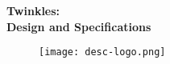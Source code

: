 \documentclass[12pt]{report}
\newcommand{\docheader}{{Twinkles:\\ \medskip Design and Specifications}}
\begin{document}
\pagestyle{empty}

\vspace*{0.3\textheight}

\begin{center}
{\Huge\bfseries \docheader}
\end{center}

\begin{figure}[!b]
\centering\texttt{[image: desc-logo.png]}
\end{figure}

\clearpage
\maketoc
\label{toc}

\pagestyle{fancy}
\fancyfoot{} %
\fancyfoot[R]{\thepage}  %

\fancyhead[L]{}
\fancyhead[R]{\descheader}
\renewcommand{\footrulewidth}{1pt}











% 

% 




\end{document}
